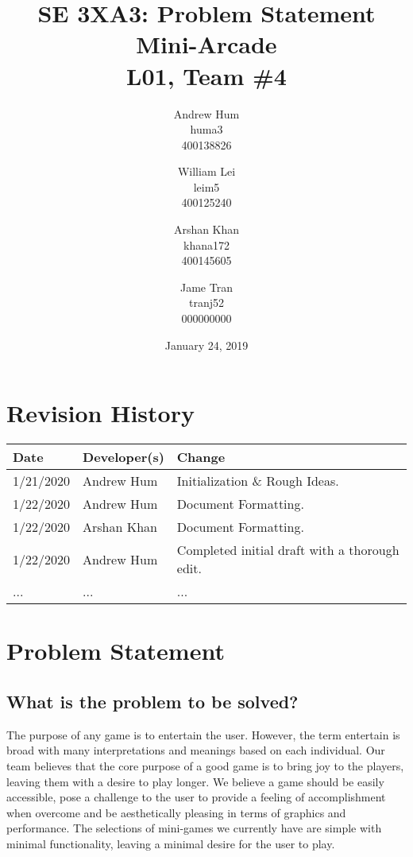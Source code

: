 \documentclass{article}
\title{SE 3XA3: Problem Statement \\ Mini-Arcade \\{\large L01, Team \#4}}
\author{Andrew Hum \\ huma3 \\ 400138826 \and
		William Lei \\ leim5 \\ 400125240 \and
		Arshan Khan \\ khana172 \\ 400145605 \and
		Jame Tran \\ tranj52 \\ 000000000
}
\date{January 24, 2019}
\begin{document}
\maketitle
\newpage

\tableofcontents
\newpage



\begin{table}[hp]
\section{Revision History} \label{TblRevisionHistory}
\begin{tabularx}{\textwidth}{llX}
\hline
\textbf{Date} & \textbf{Developer(s)} & \textbf{Change}\\
\hline
1/21/2020 & Andrew Hum & Initialization \& Rough Ideas.\\
\hline
1/22/2020 & Andrew Hum  & Document Formatting.\\
\hline
1/22/2020 & Arshan Khan & Document Formatting.\\
\hline
1/22/2020 & Andrew Hum & Completed initial draft with a thorough edit. \\
\hline
... & ... & ...\\
\hline
\end{tabularx}
\end{table}

\newpage

\section{Problem Statement}
\subsection{What is the problem to be solved?}
The purpose of any game is to entertain the user. However, the term entertain is broad with many interpretations and meanings based on each individual. Our team believes that the core purpose of a good game is to bring joy to the players, leaving them with a desire to play longer. We believe a game should be easily accessible, pose a challenge to the user to provide a feeling of accomplishment when overcome and be aesthetically pleasing in terms of graphics and performance. The selections of mini-games we currently have are simple with minimal functionality, leaving a minimal desire for the user to play.
\end{document}
